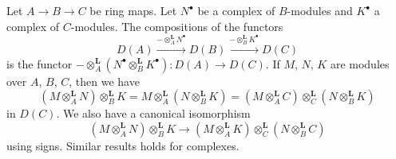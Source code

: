 \begin{lemma}
\label{lemma-double-base-change}
Let $A \to B \to C$ be ring maps. Let $N^\bullet$ be a complex of
$B$-modules and $K^\bullet$ a complex of $C$-modules.
The compositions of the functors
$$
D(A) \xrightarrow{- \otimes_A^\mathbf{L} N^\bullet}
D(B) \xrightarrow{- \otimes_B^\mathbf{L} K^\bullet} D(C)
$$
is the functor
$- \otimes_A^\mathbf{L} (N^\bullet \otimes_B^\mathbf{L} K^\bullet) :
D(A) \to D(C)$. If $M$, $N$, $K$ are modules over $A$, $B$, $C$, then
we have
$$
(M \otimes_A^\mathbf{L} N) \otimes_B^\mathbf{L} K =
M \otimes_A^\mathbf{L} (N \otimes_B^\mathbf{L} K) =
(M \otimes_A^\mathbf{L} C) \otimes_C^\mathbf{L} (N \otimes_B^\mathbf{L} K)
$$
in $D(C)$. We also have a canonical isomorphism
$$
(M \otimes_A^\mathbf{L} N) \otimes_B^\mathbf{L} K \longrightarrow
(M \otimes_A^\mathbf{L} K) \otimes_C^\mathbf{L} (N \otimes_B^\mathbf{L} C)
$$
using signs. Similar results holds for complexes.
\end{lemma}

